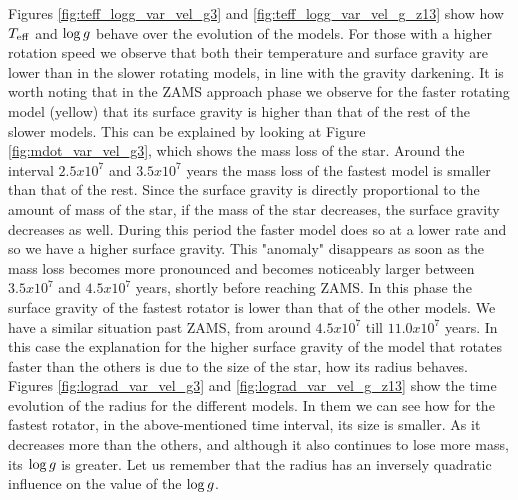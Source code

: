 \documentclass[fleqn,usenatbib]{mnras}
\begin{document}
\begin{ceqn}
Figures \ref{fig:teff_logg_var_vel_g3} and \ref{fig:teff_logg_var_vel_g_z13} show how $T_{\mathrm{eff}}$ and $\mathrm{log} \, g$ behave over the evolution of the models. For those with a higher rotation speed we observe that both their temperature and surface gravity are lower than in the slower rotating models, in line with the gravity darkening. It is worth noting that in the ZAMS approach phase we observe for the faster rotating model (yellow) that its surface gravity is higher than that of the rest of the slower models. This can be explained by looking at Figure \ref{fig:mdot_var_vel_g3}, which shows the mass loss of the star. Around the interval $2.5x10^{7}$ and $3.5x10^{7}$ years the mass loss of the fastest model is smaller than that of the rest. Since the surface gravity is directly proportional to the amount of mass of the star, if the mass of the star decreases, the surface gravity decreases as well. During this period the faster model does so at a lower rate and so we have a higher surface gravity. This "anomaly" disappears as soon as the mass loss becomes more pronounced and becomes noticeably larger between $3.5x10^{7}$ and $4.5x10^{7}$ years, shortly before reaching ZAMS. In this phase the surface gravity of the fastest rotator is lower than that of the other models. We have a similar situation past ZAMS, from around $4.5x10^{7}$ till $11.0x10^{7}$ years. In this case the explanation for the higher surface gravity of the model that rotates faster than the others is due to the size of the star, how its radius behaves. Figures \ref{fig:lograd_var_vel_g3} and \ref{fig:lograd_var_vel_g_z13} show the time evolution of the radius for the different models. In them we can see how for the fastest rotator, in the above-mentioned time interval, its size is smaller. As it decreases more than the others, and although it also continues to lose more mass, its $\mathrm{log} \, g$ is greater. Let us remember that the radius has an inversely quadratic influence on the value of the $\mathrm{log} \, g$.\par


\end{ceqn}
\end{document}
